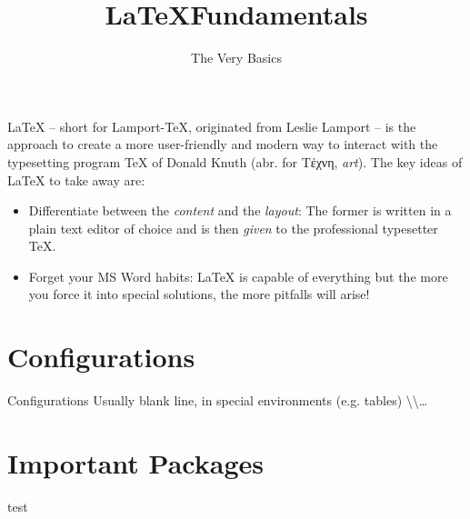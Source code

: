 

\title{\LaTeX Fundamentals}
\subtitle{The Very Basics}
\date{}



\pagestyle{empty}
\backgroundframe
\maketitle
%

%
\LaTeX{} -- short for Lamport-\TeX{}, originated from Leslie Lamport -- is the approach to create a more user-friendly and modern way to interact with the typesetting program \TeX{} of Donald Knuth (abr. for \textgreek{Τέχνη}, \textit{art}).
%
The key ideas of \LaTeX{} to take away are:
%
\begin{itemize}
  \item Differentiate between the \textit{content} and the \textit{layout}: The former is written in a plain text editor of choice and is then \textit{given} to the professional typesetter \TeX{}.
  \item Forget your MS Word habits: \LaTeX{} is capable of everything but the more you force it into special solutions, the more pitfalls will arise!
\end{itemize}

\section*{Configurations}
%
Configurations
Usually blank line, in special environments (e.g. tables) \textbackslash\textbackslash \ldots

\section*{Important Packages}

test




